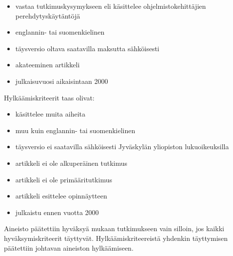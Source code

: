 \documentclass[utf8]{gradu3}
\begin{document}
\begin{itemize}
    \item vastaa tutkimuskysymykseen eli käsittelee ohjelmistokehittäjien perehdytyskäytäntöjä
    \item englannin- tai suomenkielinen
    \item täysversio oltava saatavilla maksutta sähköisesti
    \item akateeminen artikkeli
    \item julkaisuvuosi aikaisintaan 2000
\end{itemize}

Hylkäämiskriteerit taas olivat:

\begin{itemize}
    \item käsittelee muita aiheita
    \item muu kuin englannin- tai suomenkielinen
    \item täysversio ei saatavilla sähköisesti Jyväskylän yliopiston lukuoikeuksilla
    \item artikkeli ei ole alkuperäinen tutkimus
    \item artikkeli ei ole primääritutkimus
    \item artikkeli esittelee opinnäytteen
    \item julkaistu ennen vuotta 2000
\end{itemize}

Aineisto päätettiin hyväksyä mukaan tutkimukseen vain silloin, jos kaikki hyväksymiskriteerit täyttyvät. Hylkäämiskriteereistä yhdenkin täyttymisen päätettiin johtavan aineiston hylkäämiseen.



\end{document}
